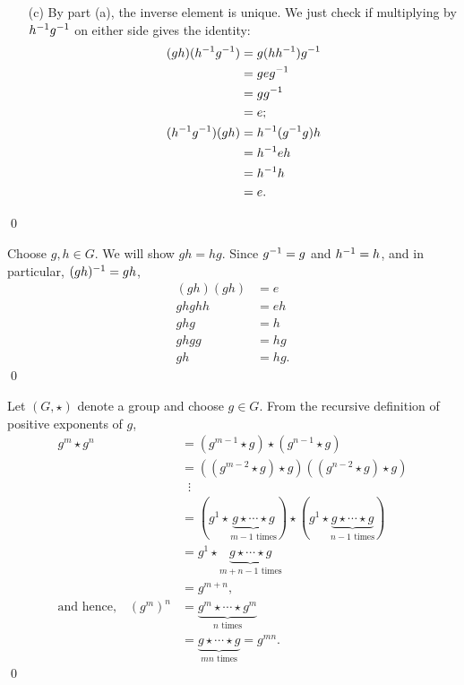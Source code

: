 \documentclass[../algebraNotesMSRI-UP2016.tex]{subfiles}
\begin{document}
\begin{frame}
\begin{itemize}
\item[(c)] By part {(a)}, the inverse element is unique.  We just check if multiplying by $h^{-1}g^{-1}$ on either side gives the identity:
\begin{align*}
(gh)(h^{-1}g^{-1}) &= g(hh^{-1})g^{-1} \\
	&= geg^{-1} \\
	&= gg^{-1} \\
	&= e; \\
(h^{-1}g^{-1})(gh) &= h^{-1}(g^{-1}g)h \\
		&= h^{-1}eh \\
		&= h^{-1}h \\
		&= e.
\end{align*}
\end{itemize}
\qed
\end{frame}

\begin{frame}
Choose $g,h\in G$.  We will show $gh=hg$.  Since $g^{-1}=g$ and $h^{-1}=h$, and in particular, $(gh)^{-1}=gh$,
\begin{align*}
(gh)(gh) &= e \\
ghghh &= eh \\
ghg &= h \\
ghgg &= hg \\
gh &= hg.
\end{align*}
\qed
\end{frame}

\begin{frame}
Let $(G,\star)$ denote a group and choose $g\in G$.  From the recursive definition of positive exponents of $g$,
\begin{align*}
g^m\star g^n &= (g^{m-1}\star g)\star(g^{n-1}\star g) \\
 &= \left((g^{m-2}\star g) \star g\right)\left((g^{n-2}\star g)\star g\right) \\[-5pt]
 &\;\;\vdots \\[-5pt]
 &= (g^1\star \underbrace{g\star \cdots \star g}_{\text{$m-1$ times}})\star (g^1\star \underbrace{g\star \cdots \star g}_{\text{$n-1$ times}}) \\
 &=g^1\star \underbrace{g\star \cdots \star g}_{\text{$m+n-1$ times}} \\
 &=g^{m+n}, \tag{1.1} \\[2pt]
\text{and hence,}\quad(g^m)^n &= \underbrace{g^m\star \cdots \star g^m}_{\text{$n$ times}} \\
	&= \underbrace{g\star \cdots \star g}_{\text{$mn$ times}} = g^{mn}. \tag{1.2}
\end{align*}
\qed
\end{frame}
\end{document}
